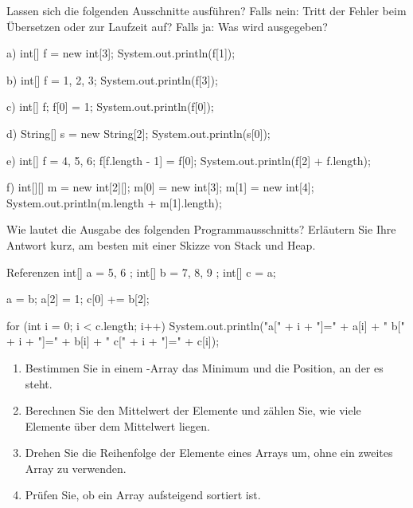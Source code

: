 Lassen sich die folgenden Ausschnitte ausführen? Falls nein: Tritt der Fehler beim Übersetzen oder zur Laufzeit auf? Falls ja: Was wird ausgegeben?
\begin{tcbraster}[raster columns=2, raster equal height=rows, raster column skip=3mm, raster row skip=1mm]
\begin{javacode}[Ausschnitt]{a)}
int[] f = new int[3];
System.out.println(f[1]);
\end{javacode}
\begin{javacode}[Ausschnitt]{b)}
int[] f = {1, 2, 3};
System.out.println(f[3]);
\end{javacode}
\begin{javacode}[Ausschnitt]{c)}
int[] f;
f[0] = 1;
System.out.println(f[0]);
\end{javacode}
\begin{javacode}[Ausschnitt]{d)}
String[] s = new String[2];
System.out.println(s[0]);
\end{javacode}
\begin{javacode}[Ausschnitt]{e)}
int[] f = {4, 5, 6};
f[f.length - 1] = f[0];
System.out.println(f[2] + f.length);
\end{javacode}
\begin{javacode}[Ausschnitt]{f)}
int[][] m = new int[2][];
m[0] = new int[3];
m[1] = new int[4];
System.out.println(m.length + m[1].length);
\end{javacode}
\end{tcbraster}

Wie lautet die Ausgabe des folgenden Programmausschnitts? Erläutern Sie Ihre Antwort kurz, am besten mit einer Skizze von Stack und Heap.
\begin{javacode}[Ausschnitt]{Referenzen}
int[] a = { 5, 6 };
int[] b = { 7, 8, 9 };
int[] c = a;

a = b;
a[2] = 1;
c[0] += b[2];

for (int i = 0; i < c.length; i++) {
	System.out.println("a[" + i + "]=" + a[i] + " b[" + i + "]=" + b[i] + " c[" + i + "]=" + c[i]);
}
\end{javacode}

\begin{enumerate}[label=\alph*)]
\item Bestimmen Sie in einem -Array das Minimum und die Position, an der es steht.
\item Berechnen Sie den Mittelwert der Elemente und zählen Sie, wie viele Elemente über dem Mittelwert liegen.
\item Drehen Sie die Reihenfolge der Elemente eines Arrays um, ohne ein zweites Array zu verwenden.
\item Prüfen Sie, ob ein Array aufsteigend sortiert ist.
\end{enumerate}

